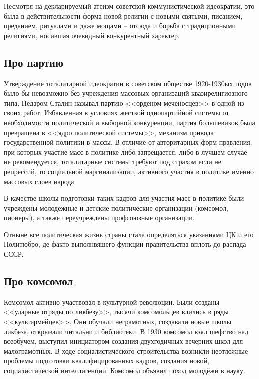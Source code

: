 \documentclass[12pt]{article}
\begin{document}
  Несмотря на декларируемый атеизм советской коммунистической идеократии, это была в действительности форма новой религии с новыми святыми,
  писанием, преданием, ритуалами и даже мощами -- отсюда и борьба с традиционными религиями, носившая очевидный конкурентный характер.

  \subsection{Про партию}
  Утверждение тоталитарной идеократии в советском обществе 1920-1930ых годов было бы невозможно без учреждения массовых организаций квазирелигиозного типа.
  Недаром Сталин называл партию <<орденом меченосцев>> в одной из своих работ.
  Избавленная в условиях жесткой однопартийной системы от необходимости политической и выборной конкуренции,
  партия большевиков была превращена в <<ядро политической системы>>, механизм привода государственной политики в массы.
  В отличие от авторитарных форм правления, при которых участие масс в политике либо запрещается,
  либо в лучшем случае не рекомендуется, тоталитарные системы требуют под страхом если не репрессий,
  то социальной маргинализации, активного участия в политике именно массовых слоев народа.

  В качестве школы подготовки таких кадров для участия масс в политике были учреждены молодежные
  и детские политические организации (комсомол, пионеры), а также переучреждены профсоюзные организации.

  Отныне все политическая жизнь страны стала определяться указаниями ЦК и его Политюбро,
  де-факто выполнвяшего функции правительства вплоть до распада СССР.

  \subsection{Про комсомол}
  Комсомол активно участвовал в культурной революции.
  Были созданы <<ударные отряды по ликбезу>>, тысячи комсомольцев влились в ряды <<культармейцев>>.
  Они обучали неграмотных, создавали новые школы ликбеза, открывали читальни и библиотеки.
  В 1930 комсомол взял шефство над всеобучем, выступил инициатором создания двухгодичных вечерних школ для малограмотных.
  В ходе социалистического строительства возникли неотложные проблемы подготовки квалифицированных кадров,
  создания новой, социалистической интеллигенции.
  Комсомол объявил поход молодёжи в науку.
\end{document}
